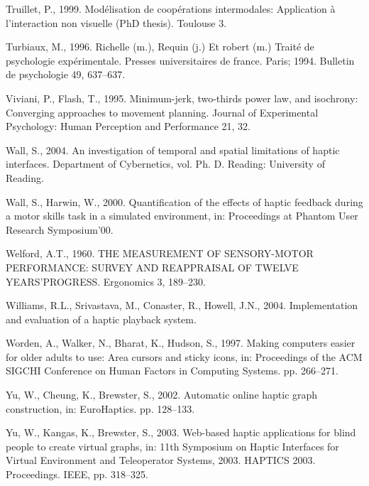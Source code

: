 \documentclass[
]{book}
\newlength{\cslhangindent}
\newlength{\cslentryspacingunit} %
\newenvironment{CSLReferences}[2] %
 {%
  \setlength{\parindent}{0pt}
  \ifodd #1
  \let\oldpar\par
  \def\par{\hangindent=\cslhangindent\oldpar}
  \fi
  \setlength{\parskip}{#2\cslentryspacingunit}
 }%
 {}
\begin{document}
\begin{CSLReferences}{1}{0}
\leavevmode{}%
Truillet, P., 1999. Mod{é}lisation de coop{é}rations intermodales: Application {à} l'interaction non visuelle (PhD thesis). Toulouse 3.

\leavevmode{}%
Turbiaux, M., 1996. Richelle (m.), Requin (j.) Et robert (m.) Trait{é} de psychologie exp{é}rimentale. Presses universitaires de france. Paris; 1994. Bulletin de psychologie 49, 637--637.

\leavevmode{}%
Viviani, P., Flash, T., 1995. Minimum-jerk, two-thirds power law, and isochrony: Converging approaches to movement planning. Journal of Experimental Psychology: Human Perception and Performance 21, 32.

\leavevmode{}%
Wall, S., 2004. An investigation of temporal and spatial limitations of haptic interfaces. Department of Cybernetics, vol. Ph. D. Reading: University of Reading.

\leavevmode{}%
Wall, S., Harwin, W., 2000. Quantification of the effects of haptic feedback during a motor skills task in a simulated environment, in: Proceedings at Phantom User Research Symposium'00.

\leavevmode{}%
Welford, A.T., 1960. THE MEASUREMENT OF SENSORY-MOTOR PERFORMANCE: SURVEY AND REAPPRAISAL OF TWELVE YEARS'PROGRESS. Ergonomics 3, 189--230.

\leavevmode{}%
Williams, R.L., Srivastava, M., Conaster, R., Howell, J.N., 2004. Implementation and evaluation of a haptic playback system.

\leavevmode{}%
Worden, A., Walker, N., Bharat, K., Hudson, S., 1997. Making computers easier for older adults to use: Area cursors and sticky icons, in: Proceedings of the ACM SIGCHI Conference on Human Factors in Computing Systems. pp. 266--271.

\leavevmode{}%
Yu, W., Cheung, K., Brewster, S., 2002. Automatic online haptic graph construction, in: EuroHaptics. pp. 128--133.

\leavevmode{}%
Yu, W., Kangas, K., Brewster, S., 2003. Web-based haptic applications for blind people to create virtual graphs, in: 11th Symposium on Haptic Interfaces for Virtual Environment and Teleoperator Systems, 2003. HAPTICS 2003. Proceedings. IEEE, pp. 318--325.


\end{CSLReferences}
\end{document}
